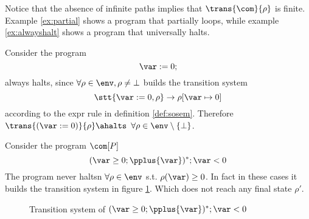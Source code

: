 Notice that the absence of infinite paths implies that
\(\trans{\com}{\rho}\) is finite.  Example \ref{ex:partial} shows a
program that partially loops, while example \ref{ex:alwayshalt} shows
a program that universally halts.


\begin{example}\label{ex:alwayshalt}
  Consider the program
  \begin{equation*}
    \var := 0;
  \end{equation*}
  always halts, since \(\forall\rho \in \env, \rho \neq \bot\) builds
  the transition system \[\stt{\var := 0, \rho} \to \rho[\var \mapsto
    0]\] according to the expr rule in definition
  \ref{def:sosem}. Therefore \(\trans{(\var := 0)}{\rho} \ahalts\)
  \(\forall \rho \in \env\setminus\{\bot\}\).
\end{example}

\begin{example}\label{ex:neverhalts}
  Consider the program \(\com[P]\) \[(\var \geq 0;
  \pplus{\var})^*;\var < 0\] The program never haltsn \(\forall \rho
  \in \env\) s.t. \(\rho(\var) \geq 0\). In fact in these cases it
  builds the transition system in figure \ref{fig:tsysnhalt}. Which
  does not reach any final state \(\rho'\).
  \begin{figure}
    \caption{Transition system of \((\var \geq 0; \pplus{\var})^*;\var
      < 0\)}\label{fig:tsysnhalt}
  \end{figure}
\end{example}

